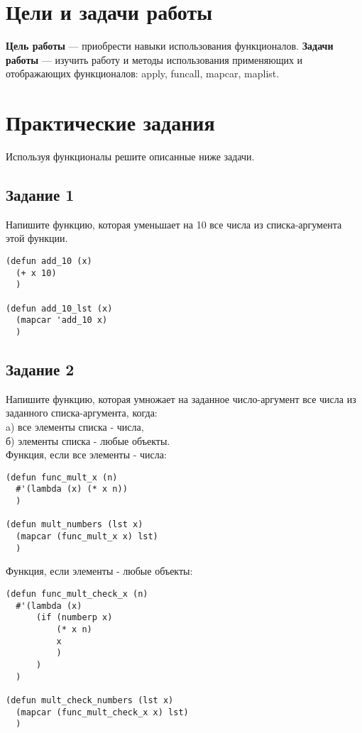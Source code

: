 \chapter{Цели и задачи работы}
\textbf{Цель работы} --- приобрести навыки использования функционалов.
\textbf{Задачи работы} --- изучить работу и методы использования применяющих и отображающих функционалов: apply, funcall, mapcar, maplist.

\chapter{Практические задания}
Используя функционалы решите описанные ниже задачи.
\section{Задание 1}
Напишите функцию, которая уменьшает на 10 все числа из списка-аргумента этой функции.

\begin{lstlisting}
(defun add_10 (x)
  (+ x 10)
  )

(defun add_10_lst (x)
  (mapcar 'add_10 x)
  )
\end{lstlisting}

\section{Задание 2}
Напишите функцию, которая умножает на заданное число-аргумент все числа из заданного списка-аргумента, когда:\\
a) все элементы списка - числа,\\
б) элементы списка - любые объекты.\\

Функция, если все элементы - числа:\\
\begin{lstlisting}
(defun func_mult_x (n)
  #'(lambda (x) (* x n))
  )

(defun mult_numbers (lst x)
  (mapcar (func_mult_x x) lst)
  )
\end{lstlisting}

Функция, если элементы - любые объекты:\\
\begin{lstlisting}
(defun func_mult_check_x (n)
  #'(lambda (x)
      (if (numberp x)
          (* x n)
          x
          )
      )
  )

(defun mult_check_numbers (lst x)
  (mapcar (func_mult_check_x x) lst)
  )
\end{lstlisting}


